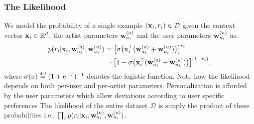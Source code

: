 \subsubsection{The Likelihood}
We model the probability of a single example $(\mathbf{x}_i, r_i) \in \mathcal{D}$ given the context vector $\mathbf{x}_i\in\mathbb{R}^d$,
the artist parameters $\mathbf{w}^{(a)}_{a_i}$ and the user parameters $\mathbf{w}^{(u)}_{u_i}$  as:
\begin{align}
 p( r_i | \mathbf{x}_i , \mathbf{w}^{(a)}_{a_i}, \mathbf{w}^{(u)}_{u_i} )
& =  \big[ \sigma \big( \mathbf{x}_i^\top ( \mathbf{w}^{(a)}_{a_i} + \mathbf{w}^{(u)}_{u_i} ) \big) \big]^{r_i} \nonumber \\ 
& \ \:  \cdot \big[ 1 - \sigma \big( \mathbf{x}_i^\top ( \mathbf{w}^{(a)}_{a_i} + \mathbf{w}^{(u)}_{u_i} ) \big) \big]^{(1-r_i)} ,
\label{eq:likelihood}
\end{align}
where  $\sigma(x) \defined (1 + \mathrm{e}^{-x})^{-1}$ denotes the logistic function. Note how the likelihood depends on both per-user and per-artist parameters. Personalization is afforded by the user parameters which allow deviations according to user specific preferences %
The likelihood of the entire dataset $\mathcal{D}$ is simply the product of these probabilities i.e., $\prod_i p( r_i | \mathbf{x}_i , \mathbf{w}^{(a)}_{a_i}, \mathbf{w}^{(u)}_{u_i})$.


